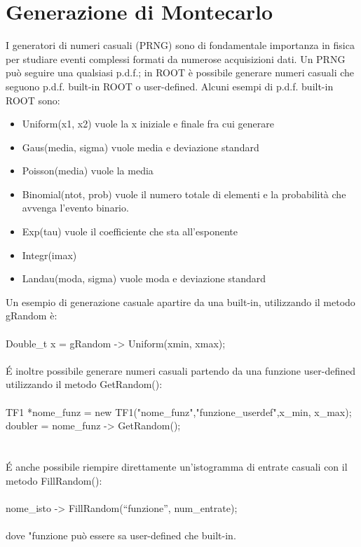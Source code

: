 \documentclass[10pt,a4paper]{article}
\begin{document}
\section{Generazione di Montecarlo}\label{sec:montecarlo}
I generatori di numeri casuali (PRNG) sono di fondamentale importanza in fisica per studiare eventi complessi formati da numerose acquisizioni dati.
Un PRNG può seguire una qualsiasi p.d.f.; in ROOT è possibile generare numeri casuali che seguono p.d.f. built-in ROOT o user-defined. Alcuni esempi di p.d.f. built-in ROOT sono: 
\begin{itemize}
	\item Uniform(x1, x2)
	vuole la x iniziale e finale fra cui generare
	\item Gaus(media, sigma)
	vuole media e deviazione standard
	\item Poisson(media)
	vuole la media
	\item Binomial(ntot, prob)
	vuole il numero totale di elementi e la probabilità che avvenga l'evento binario.
	\item Exp(tau)
	vuole il coefficiente che sta all'esponente
	\item Integr(imax)	
	\item Landau(moda, sigma)
	vuole moda e deviazione standard
\end{itemize}
Un esempio di generazione casuale apartire da una built-in, utilizzando il metodo gRandom è:\\\\
Double\_t x = gRandom -> Uniform(xmin, xmax);\\\\
\'{E} inoltre possibile generare numeri casuali partendo da una funzione user-defined utilizzando il metodo GetRandom():\\\\
TF1 *nome\_funz = new TF1("nome\_funz","funzione\_userdef",x\_min, x\_max);\\
doubler = nome\_funz -> GetRandom();\\\\
\\\'{E} anche possibile riempire direttamente un'istogramma di entrate casuali con il metodo FillRandom():\\\\
 nome\_isto -> FillRandom(“funzione”, num\_entrate);\\\\
dove "funzione può essere sa user-defined che built-in.
\newpage
\appendix
\end{document}
